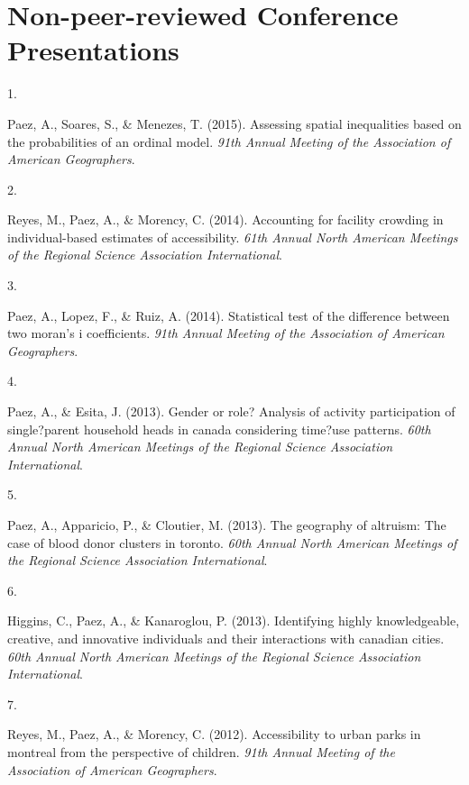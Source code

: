 \documentclass[10pt,a4paper,]{twentysecondcv}
\newlength{\csllabelwidth}
\newcommand{\CSLLeftMargin}[1]{\parbox[t]{\csllabelwidth}{#1}}
\newcommand{\CSLRightInline}[1]{\parbox[t]{\linewidth - \csllabelwidth}{#1}}
\begin{document}
\hypertarget{non-peer-reviewed-conference-presentations}{%
\section{Non-peer-reviewed Conference
Presentations}\label{non-peer-reviewed-conference-presentations}}

\hypertarget{bibliography}{}
\leavevmode{}%
\CSLLeftMargin{1. }%
\CSLRightInline{Paez, A., Soares, S., \& Menezes, T. (2015). Assessing
spatial inequalities based on the probabilities of an ordinal model.
\emph{91th Annual Meeting of the Association of American Geographers}.}

\leavevmode{}%
\CSLLeftMargin{2. }%
\CSLRightInline{Reyes, M., Paez, A., \& Morency, C. (2014). Accounting
for facility crowding in individual-based estimates of accessibility.
\emph{61th Annual North American Meetings of the Regional Science
Association International}.}

\leavevmode{}%
\CSLLeftMargin{3. }%
\CSLRightInline{Paez, A., Lopez, F., \& Ruiz, A. (2014). Statistical
test of the difference between two moran's i coefficients. \emph{91th
Annual Meeting of the Association of American Geographers}.}

\leavevmode{}%
\CSLLeftMargin{4. }%
\CSLRightInline{Paez, A., \& Esita, J. (2013). Gender or role? Analysis
of activity participation of single?parent household heads in canada
considering time?use patterns. \emph{60th Annual North American Meetings
of the Regional Science Association International}.}

\leavevmode{}%
\CSLLeftMargin{5. }%
\CSLRightInline{Paez, A., Apparicio, P., \& Cloutier, M. (2013). The
geography of altruism: The case of blood donor clusters in toronto.
\emph{60th Annual North American Meetings of the Regional Science
Association International}.}

\leavevmode{}%
\CSLLeftMargin{6. }%
\CSLRightInline{Higgins, C., Paez, A., \& Kanaroglou, P. (2013).
Identifying highly knowledgeable, creative, and innovative individuals
and their interactions with canadian cities. \emph{60th Annual North
American Meetings of the Regional Science Association International}.}

\leavevmode{}%
\CSLLeftMargin{7. }%
\CSLRightInline{Reyes, M., Paez, A., \& Morency, C. (2012).
Accessibility to urban parks in montreal from the perspective of
children. \emph{91th Annual Meeting of the Association of American
Geographers}.}
\end{document}

